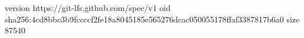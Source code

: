 version https://git-lfs.github.com/spec/v1
oid sha256:4cd8bbc3b9fccccf2fe18a8045185e565276dcac050055178ffaf3387817b6a0
size 87540
